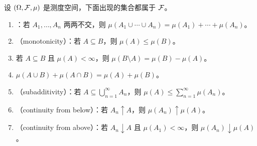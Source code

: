 
\begin{theorem}[测度的基本性质]\label{thm:measures:basic}
设 $(\Omega,\mathcal{F},\mu)$ 是测度空间，下面出现的集合都属于 $\mathcal{F}$。
\begin{enumerate}
\item {}：若 $A_1,\dots,A_n$ 两两不交，则 $\mu(A_1\cup\cdots\cup A_n)=\mu(A_1)+\cdots+\mu(A_n)$。
\item {}（monotonicity）：若 $A\subseteq B$，则 $\mu(A)\leqslant\mu(B)$。
\item 若 $A\subseteq B$ 且 $\mu(A)<\infty$，则 $\mu(B\setminus A)=\mu(B)-\mu(A)$。
\item $\mu(A\cup B)+\mu(A\cap B)=\mu(A)+\mu(B)$。
\item {}（subadditivity）：若 $A\subseteq\bigcup_{n=1}^\infty A_n$，则 $\mu(A)\leqslant\sum_{n=1}^\infty\mu(A_n)$。
\item {}（continuity from below）：若 $A_n\uparrow A$，则 $\mu(A_n)\uparrow\mu(A)$。
\item {}（continuity from above）：若 $A_n\downarrow A$ 且 $\mu(A_1)<\infty$，则 $\mu(A_n)\downarrow\mu(A)$。
\end{enumerate}
\end{theorem}
